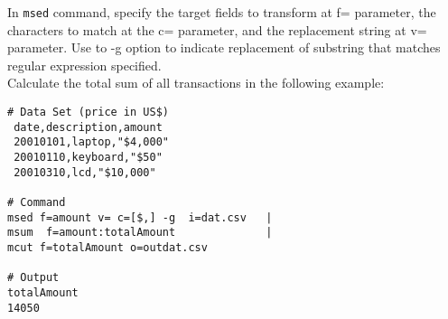In \verb|msed| command, specify the target fields to transform at f= parameter, the characters to match at the c= parameter, and the replacement string at v= parameter.  Use to -g option to indicate replacement of substring that matches regular expression specified. \\

Calculate the total sum of all transactions in the following example: 

 \begin{verbatim}
# Data Set (price in US$)
 date,description,amount
 20010101,laptop,"$4,000"
 20010110,keyboard,"$50"
 20010310,lcd,"$10,000"
 
# Command
msed f=amount v= c=[$,] -g 	i=dat.csv 	|
msum  f=amount:totalAmount  			| 
mcut f=totalAmount o=outdat.csv

# Output 
totalAmount
14050
 \end{verbatim}

